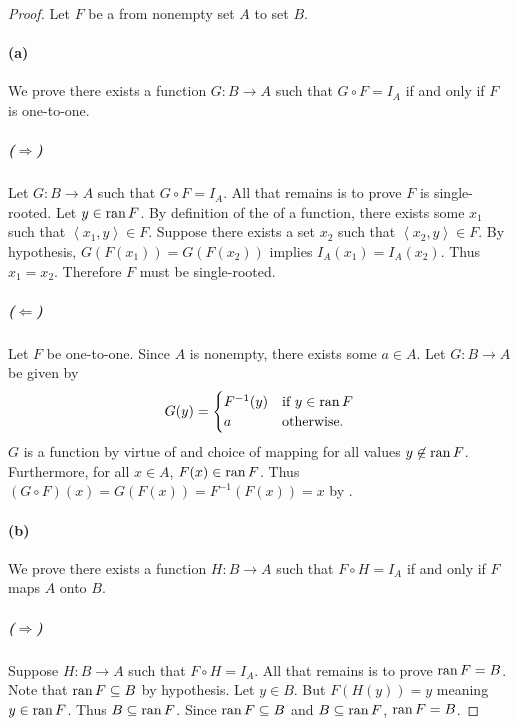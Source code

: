 \documentclass{report}
\newcommand{\pair}[1]{\left< #1 \right>}
\begin{document}
\begin{proof}

  Let $F$ be a  from nonempty set $A$ to set $B$.

  \paragraph{(a)}%

    We prove there exists a function $G \colon B \rightarrow A$ such that
      $G \circ F = I_A$ if and only if $F$ is one-to-one.

    \subparagraph{($\Rightarrow$)}%

      Let $G \colon B \rightarrow A$ such that $G \circ F = I_A$.
      All that remains is to prove $F$ is single-rooted.
      Let $y \in \mathop{\text{ran}}{F}$.
      By definition of the  of a function, there exists some
        $x_1$ such that $\pair{x_1, y} \in F$.
      Suppose there exists a set $x_2$ such that $\pair{x_2, y} \in F$.
      By hypothesis, $G(F(x_1)) = G(F(x_2))$ implies $I_A(x_1) = I_A(x_2)$.
      Thus $x_1 = x_2$.
      Therefore $F$ must be single-rooted.

    \subparagraph{($\Leftarrow$)}%

      Let $F$ be one-to-one.
      Since $A$ is nonempty, there exists some $a \in A$.
      Let $G \colon B \rightarrow A$ be given by
        $$G(y) = \begin{cases}
          F^{-1}(y) & \text{if } y \in \mathop{\text{ran}}{F} \\
          a & \text{otherwise}.
        \end{cases}$$
      $G$ is a function by virtue of  and choice
        of mapping for all values $y \not\in \mathop{\text{ran}}{F}$.
      Furthermore, for all $x \in A$, $F(x) \in \mathop{\text{ran}}{F}$.
      Thus $(G \circ F)(x) = G(F(x)) = F^{-1}(F(x)) = x$ by
        .

  \paragraph{(b)}%

    We prove there exists a function $H \colon B \rightarrow A$ such that
      $F \circ H = I_A$ if and only if $F$ maps $A$ onto $B$.

    \subparagraph{($\Rightarrow$)}%

      Suppose $H \colon B \rightarrow A$ such that $F \circ H = I_A$.
      All that remains is to prove $\mathop{\text{ran}}{F} = B$.
      Note that $\mathop{\text{ran}}{F} \subseteq B$ by hypothesis.
      Let $y \in B$.
      But $F(H(y)) = y$ meaning $y \in \mathop{\text{ran}}{F}$.
      Thus $B \subseteq \mathop{\text{ran}}{F}$.
      Since $\mathop{\text{ran}}{F} \subseteq B$ and $B \subseteq \mathop{\text{ran}}{F}$, $\mathop{\text{ran}}{F} = B$.


\end{proof}
\end{document}
